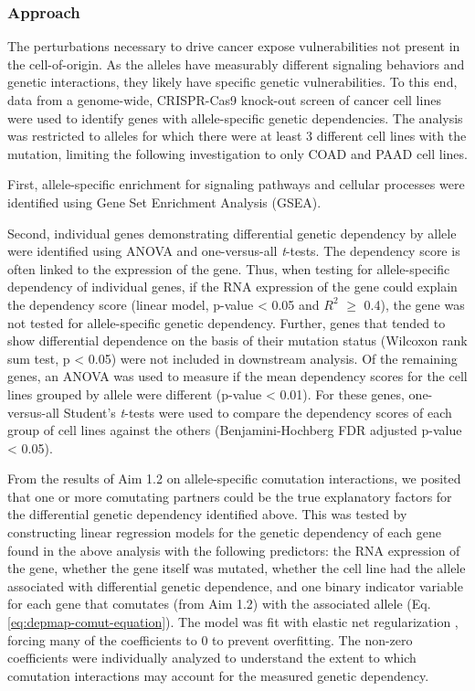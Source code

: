 \subsubsection*{Approach}

The perturbations necessary to drive cancer expose vulnerabilities not present in the cell-of-origin.
As the \KRAS{} alleles have measurably different signaling behaviors and genetic interactions, they likely have specific genetic vulnerabilities.
To this end, data from a genome-wide, CRISPR-Cas9 knock-out screen of cancer cell lines \cite{Tsherniak2017, Meyers2017} were used to identify genes with \KRAS{} allele-specific genetic dependencies.
The analysis was restricted to \KRAS{} alleles for which there were at least 3 different cell lines with the mutation, limiting the following investigation to only COAD and PAAD cell lines.

First, allele-specific enrichment for signaling pathways and cellular processes were identified using Gene Set Enrichment Analysis (GSEA).

Second, individual genes demonstrating differential genetic dependency by \KRAS{} allele were identified using ANOVA and one-versus-all \emph{t}-tests.
The dependency score is often linked to the expression of the gene.
Thus, when testing for allele-specific dependency of individual genes, if the RNA expression of the gene could explain the dependency score (linear model, p-value < 0.05 and $R^2$ $\ge$ 0.4), the gene was not tested for \KRAS{} allele-specific genetic dependency.
Further, genes that tended to show differential dependence on the basis of their mutation status (Wilcoxon rank sum test, p < 0.05) were not included in downstream analysis.
Of the remaining genes, an ANOVA was used to measure if the mean dependency scores for the cell lines grouped by \KRAS{} allele were different (p-value < 0.01).
For these genes, one-versus-all Student's \emph{t}-tests were used to compare the dependency scores of each group of cell lines against the others (Benjamini-Hochberg FDR adjusted p-value < 0.05).

From the results of Aim 1.2 on allele-specific comutation interactions, we posited that one or more comutating partners could be the true explanatory factors for the differential genetic dependency identified above.
This was tested by constructing linear regression models for the genetic dependency of each gene found in the above analysis with the following predictors: the RNA expression of the gene, whether the gene itself was mutated, whether the cell line had the \KRAS{} allele associated with differential genetic dependence, and one binary indicator variable for each gene that comutates (from Aim 1.2) with the associated \KRAS{} allele (Eq. \ref{eq:depmap-comut-equation}).
The model was fit with elastic net regularization \cite{Zou2005RegularizationNet}, forcing many of the coefficients to 0 to prevent overfitting.
The non-zero coefficients were individually analyzed to understand the extent to which comutation interactions may account for the measured genetic dependency.

